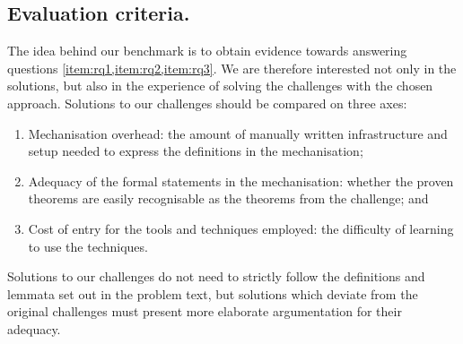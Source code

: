 \documentclass[runningheads]{llncs}
\begin{document}


\subsection{Evaluation criteria.}
The idea behind our benchmark is to obtain evidence towards answering
questions \cref{item:rq1,item:rq2,item:rq3}. We are therefore
interested not only in the solutions, but also in the experience of
solving the challenges with the chosen approach.  Solutions to our
challenges should be compared on three axes:
\begin{enumerate}
\item Mechanisation overhead: the amount of manually written infrastructure and setup needed to express the definitions in the mechanisation;
\item Adequacy of the formal statements in the mechanisation: whether the proven theorems are easily recognisable as the theorems from the challenge; and
\item Cost of entry for the tools and techniques employed: the difficulty of learning to use the techniques.
\end{enumerate}
Solutions to our challenges do not need to strictly follow the definitions and lemmata set out in the problem text, but solutions which deviate from the original challenges must present more elaborate argumentation for their adequacy.


\end{document}
